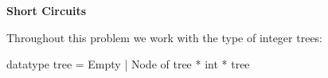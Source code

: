 

\textbf{Short Circuits}

Throughout this problem we work with the type of integer trees:
\begin{codeblock}
  datatype tree = Empty | Node of tree * int * tree
\end{codeblock}

